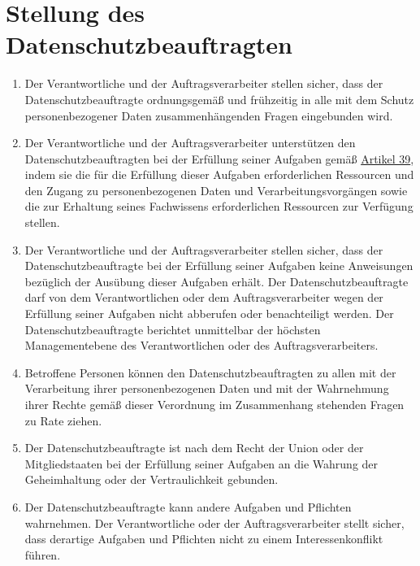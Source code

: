 \chapter{Stellung des Datenschutzbeauftragten}
\label{ch:38}


\begin{enumerate}

  \item Der Verantwortliche und der Auftragsverarbeiter stellen sicher, dass der Datenschutzbeauftragte ordnungsgemäß
   und frühzeitig in alle mit dem Schutz personenbezogener Daten zusammenhängenden Fragen eingebunden wird.
  \label{itm:38-1}

  \item Der Verantwortliche und der Auftragsverarbeiter unterstützen den Datenschutzbeauftragten bei der Erfüllung
   seiner Aufgaben gemäß \hyperref[ch:39]{Artikel 39}, indem sie die für die Erfüllung dieser Aufgaben erforderlichen
   Ressourcen und den Zugang zu personenbezogenen Daten und Verarbeitungsvorgängen sowie die zur Erhaltung seines
   Fachwissens erforderlichen Ressourcen zur Verfügung stellen.
  \label{itm:38-2}

  \item Der Verantwortliche und der Auftragsverarbeiter stellen sicher, dass der Datenschutzbeauftragte bei der
   Erfüllung seiner Aufgaben keine Anweisungen bezüglich der Ausübung dieser Aufgaben erhält. Der
   Datenschutzbeauftragte darf von dem Verantwortlichen oder dem Auftragsverarbeiter wegen der Erfüllung seiner
   Aufgaben nicht abberufen oder benachteiligt werden. Der Datenschutzbeauftragte berichtet unmittelbar der höchsten
   Managementebene des Verantwortlichen oder des Auftragsverarbeiters.
  \label{itm:38-3}

  \item Betroffene Personen können den Datenschutzbeauftragten zu allen mit der Verarbeitung ihrer personenbezogenen
   Daten und mit der Wahrnehmung ihrer Rechte gemäß dieser Verordnung im Zusammenhang stehenden Fragen zu Rate ziehen.
  \label{itm:38-4}

  \item Der Datenschutzbeauftragte ist nach dem Recht der Union oder der Mitgliedstaaten bei der Erfüllung seiner
   Aufgaben an die Wahrung der Geheimhaltung oder der Vertraulichkeit gebunden.
  \label{itm:38-5}

  \item Der Datenschutzbeauftragte kann andere Aufgaben und Pflichten wahrnehmen. Der Verantwortliche oder der
   Auftragsverarbeiter stellt sicher, dass derartige Aufgaben und Pflichten nicht zu einem Interessenkonflikt führen.
  \label{itm:38-6}

\end{enumerate}


